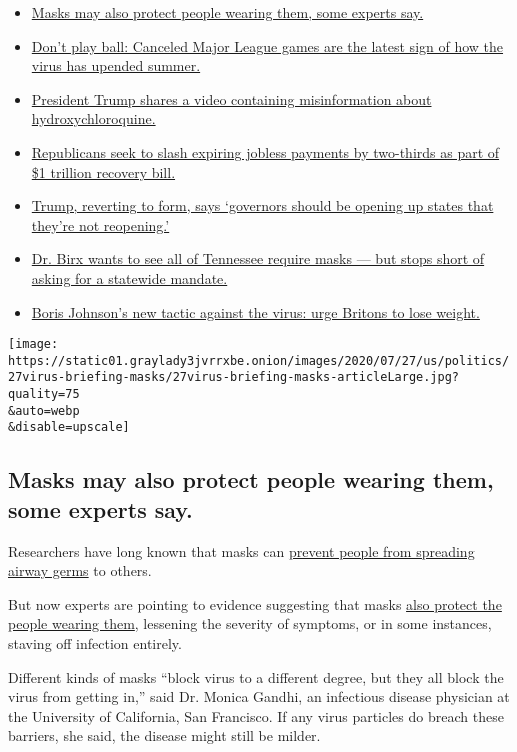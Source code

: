\begin{itemize}
\tightlist
\item
  \protect\hyperlink{link-68280489}{Masks may also protect people
  wearing them, some experts say.}
\item
  \protect\hyperlink{link-4e079f3e}{Don't play ball: Canceled Major
  League games are the latest sign of how the virus has upended summer.}
\item
  \protect\hyperlink{link-42d380d8}{President Trump shares a video
  containing misinformation about hydroxychloroquine.}
\item
  \protect\hyperlink{link-718e6382}{Republicans seek to slash expiring
  jobless payments by two-thirds as part of \$1 trillion recovery bill.}
\item
  \protect\hyperlink{link-512ba64b}{Trump, reverting to form, says
  `governors should be opening up states that they're not reopening.'}
\item
  \protect\hyperlink{link-216a816a}{Dr. Birx wants to see all of
  Tennessee require masks --- but stops short of asking for a statewide
  mandate.}
\item
  \protect\hyperlink{link-5e8a1d38}{Boris Johnson's new tactic against
  the virus: urge Britons to lose weight.}
\end{itemize}

\texttt{[image: https://static01.graylady3jvrrxbe.onion/images/2020/07/27/us/politics/27virus-briefing-masks/27virus-briefing-masks-articleLarge.jpg?quality=75\\\&auto=webp\\\&disable=upscale]}

\hypertarget{masks-may-also-protect-people-wearing-them-some-experts-say}{%
\subsection{Masks may also protect people wearing them, some experts
say.}\label{masks-may-also-protect-people-wearing-them-some-experts-say}}

Researchers have long known that masks can
\href{https://journals.plos.org/plospathogens/article?id=10.1371/journal.ppat.1003205}{prevent
people from spreading airway germs} to others.

But now experts are pointing to evidence suggesting that masks
\href{https://pubmed.ncbi.nlm.nih.gov/23498357/}{also protect the people
wearing them}, lessening the severity of symptoms, or in some instances,
staving off infection entirely.

Different kinds of masks ``block virus to a different degree, but they
all block the virus from getting in,'' said Dr. Monica Gandhi, an
infectious disease physician at the University of California, San
Francisco. If any virus particles do breach these barriers, she said,
the disease might still be milder.

